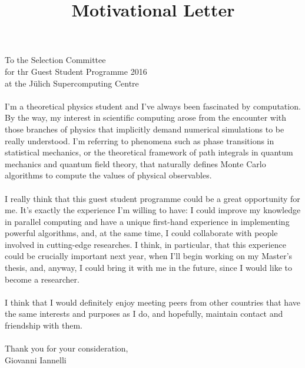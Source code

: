 \documentclass{article}
\title{Motivational Letter}
\date{}
\begin{document}
\maketitle
\thispagestyle{empty}
\noindent To the Selection Committee\\
for thr Guest Student Programme 2016\\
at the J\"ulich Supercomputing Centre\\ \\
I'm a theoretical physics student and I've always been fascinated by computation. By the way, my interest in scientific computing arose from the encounter with those branches of physics that implicitly demand numerical simulations to be really understood. I'm referring to phenomena such as phase transitions in statistical mechanics, or the theoretical framework of path integrals in quantum mechanics and quantum field theory, that naturally defines Monte Carlo algorithms to compute the values of physical observables.\\ \\
I really think that this guest student programme could be a great opportunity for me. It's exactly the experience I'm willing to have: I could improve my knowledge in parallel computing and have a unique first-hand experience in implementing powerful algorithms, and, at the same time, I could collaborate with people involved in cutting-edge researches. I think, in particular, that this experience could be crucially important next year, when I'll begin working on my Master's thesis, and, anyway, I could bring it with me in the future, since I would like to become a researcher.\\ \\
I think that I would definitely enjoy meeting peers from other countries that have the same interests and purposes as I do, and hopefully, maintain contact and friendship with them.\\ \\
Thank you for your consideration,\\
Giovanni Iannelli
\end{document}
